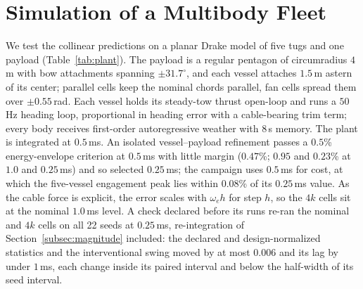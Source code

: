 \section{Simulation of a Multibody Fleet}\label{sec:test}

We test the collinear predictions on a planar Drake model \cite{tedrake2019drake} of five tugs and one payload (Table~\ref{tab:plant}). The payload is a regular pentagon of circumradius $4$\,m with bow attachments spanning $\pm31.7^\circ$, and each vessel attaches $1.5$\,m astern of its center; parallel cells keep the nominal chords parallel, fan cells spread them over $\pm0.55$\,rad. Each vessel holds its steady-tow thrust open-loop and runs a $50$\,Hz heading loop, proportional in heading error with a cable-bearing trim term; every body receives first-order autoregressive weather with $8$\,s memory. The plant is integrated at $0.5$\,ms. An isolated vessel--payload refinement passes a $0.5$\% energy-envelope criterion at $0.5$\,ms with little margin ($0.47$\%; $0.95$ and $0.23$\% at $1.0$ and $0.25$\,ms) and so selected $0.25$\,ms; the campaign uses $0.5$\,ms for cost, at which the five-vessel engagement peak lies within $0.08$\% of its $0.25$\,ms value. As the cable force is explicit, the error scales with $\omega_e h$ for step $h$, so the $4k$ cells sit at the nominal $1.0$\,ms level. A check declared before its runs re-ran the nominal and $4k$ cells on all 22 seeds at $0.25$\,ms, re-integration of Section~\ref{subsec:magnitude} included: the declared and design-normalized statistics and the interventional swing moved by at most $0.006$ and its lag by under $1$\,ms, each change inside its paired interval and below the half-width of its seed interval.


